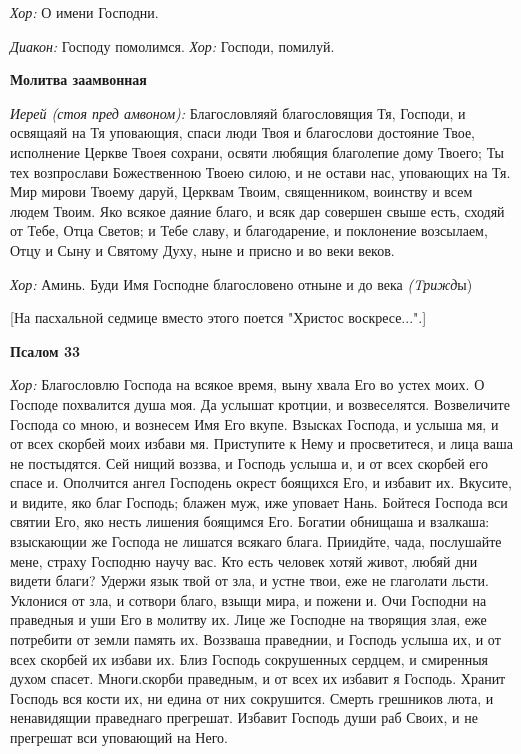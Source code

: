 {\itshape    Хор:} О имени Господни. 

{\itshape    Диакон:} Господу помолимся. {\itshape  Хор:} Господи, помилуй.  

\medskip 

 {\bfseries Молитва заамвонная }

 {\itshape   Иерей (стоя пред амвоном):} Благословляяй благословящия Тя, Господи, и освящаяй на Тя уповающия, спаси люди Твоя и благослови достояние Твое, исполнение Церкве Твоея сохрани, освяти любящия благолепие дому Твоего; Ты тех возпрослави Божественною Твоею силою, и не остави нас, уповающих на Тя. Мир мирови Твоему даруй, Церквам Твоим, священником, воинству и всем людем Твоим. Яко всякое даяние благо, и всяк дар совершен свыше есть, сходяй от Тебе, Отца Светов; и Тебе славу, и благодарение, и поклонение возсылаем, Отцу и Сыну и Святому Духу, ныне и присно и во веки веков. 

{\itshape    Хор:} Аминь. Буди Имя Господне благословено отныне и до века {\itshape (Tрижд}ы)

   [На пасхальной седмице вместо этого поется "Христос воскресе...".] 

\medskip 

{\bfseries  Псалом 33 }

 {\bfseries  }{\itshape  Хор:} Благословлю Господа на всякое время, выну хвала Его во устех моих. О Господе похвалится душа моя. Да услышат кротции, и возвеселятся. Возвеличите Господа со мною, и вознесем Имя Его вкупе. Взысках Господа, и услыша мя, и от всех скорбей моих избави мя. Приступите к Нему и просветитеся, и лица ваша не постыдятся. Сей нищий воззва, и Господь услыша и, и от всех скорбей его спасе и. Ополчится ангел Господень окрест боящихся Его, и избавит их. Вкусите, и видите, яко благ Господь; блажен муж, иже уповает Нань. Бойтеся Господа вси святии Его, яко несть лишения боящимся Его. Богатии обнищаша и взалкаша: взыскающии же Господа не лишатся всякаго блага. Приидйте, чада, послушайте мене, страху Господню научу вас. Кто есть человек хотяй живот, любяй дни видети благи? Удержи язык твой от зла, и устне твои, еже не глаголати льсти. Уклонися от зла, и сотвори благо, взыщи мира, и пожени и. Очи Господни на праведныя и уши Его в молитву их. Лице же Господне на творящия злая, еже потребити от земли память их. Воззваша праведнии, и Господь услыша их, и от всех скорбей их избави их. Близ Господь сокрушенных сердцем, и смиренныя духом спасет. Многи.скорби праведным, и от всех их избавит я Господь. Хранит Господь вся кости их, ни едина от них сокрушится. Смерть грешников люта, и ненавидящии праведнаго прегрешат. Избавит Господь души раб Своих, и не прегрешат вси уповающий на Него. 

